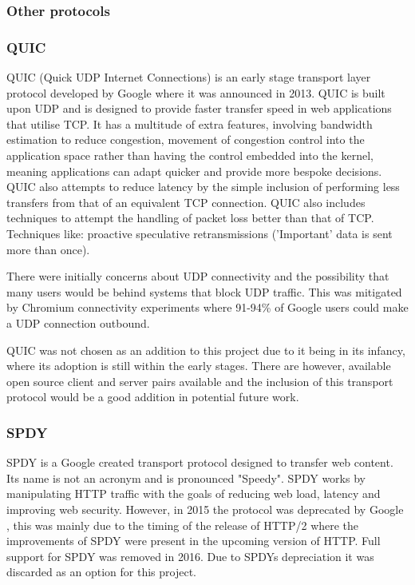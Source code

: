\subsubsection{Other protocols}
\subsubsection*{QUIC}
QUIC (Quick UDP Internet Connections) \citep{hamilton2016quic} is an early stage transport layer protocol developed by Google where it was announced in 2013. QUIC is built upon UDP and is designed to provide faster transfer speed in web applications that utilise TCP.
It has a multitude of extra features, involving bandwidth estimation to reduce congestion, movement of congestion control into the application space rather than having the control embedded into the kernel, meaning applications can adapt quicker and provide more bespoke decisions. QUIC also attempts to reduce latency by the simple inclusion of performing less transfers from that of an equivalent TCP connection. QUIC also includes techniques to attempt the handling of packet loss better than that of TCP. Techniques like: proactive speculative retransmissions ('Important' data is sent more than once).

There were initially concerns about UDP connectivity and the possibility that many users would be behind systems that block UDP traffic. This was mitigated by Chromium connectivity experiments \citep{roskind2013quic} where 91-94\% of Google users could make a UDP connection outbound.

QUIC was not chosen as an addition to this project due to it being in its infancy, where its adoption is still within the early stages. There are however, available open source client and server pairs available and the inclusion of this transport protocol would be a good addition in potential future work.

\subsubsection*{SPDY}
SPDY \citep{belshe2012spdy} is a Google created transport protocol designed to transfer web content. Its name is not an acronym and is pronounced "Speedy". SPDY works by manipulating HTTP traffic with the goals of reducing web load, latency and improving web security. However, in 2015 the protocol was deprecated by Google \citep{blog2015hello}, this was mainly due to the timing of the release of HTTP/2 where the improvements of SPDY were present in the upcoming version of HTTP. Full support for SPDY was removed in 2016. Due to SPDYs depreciation it was discarded as an option for this project.

